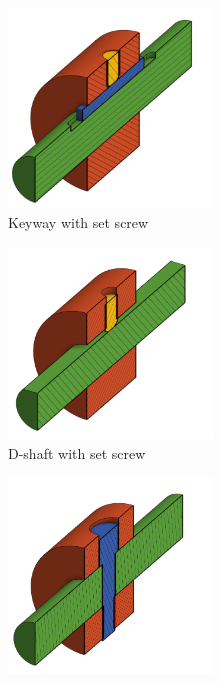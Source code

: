 	\begin{figure}[H]
		\centering
		\begin{subfigure}[b]{.32\linewidth}
			\includegraphics[width=0.6\textwidth]{imgs/keyedshaft.png}
			\caption{Keyway with set screw}
		\end{subfigure}
		\begin{subfigure}[b]{.32\linewidth}
			\includegraphics[width=0.6\textwidth]{imgs/dshaft.png}
			\caption{D-shaft with set screw}
		\end{subfigure}
		\begin{subfigure}[b]{.32\linewidth}
			\includegraphics[width=0.6\textwidth]{imgs/pinnedshaft.png}

\end{subfigure}
\end{figure}
